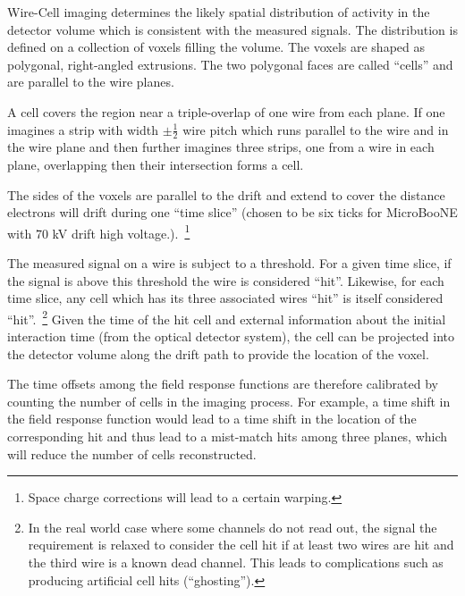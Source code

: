 Wire-Cell imaging determines the likely spatial distribution of
activity in the detector volume which is consistent with the measured
signals.  The distribution is defined on a collection of voxels
filling the volume.  The voxels are shaped as polygonal, right-angled
extrusions.  The two polygonal faces are called ``cells'' and are
parallel to the wire planes.

A cell covers the region near a triple-overlap of one wire from each
plane.  If one imagines a strip with width $\pm\frac{1}{2}$ wire pitch
which runs parallel to the wire and in the wire plane and then further
imagines three strips, one from a wire in each plane, overlapping then
their intersection forms a cell.

The sides of the voxels are parallel to the drift and extend to cover
the distance electrons will drift during one ``time slice'' (chosen to be six
ticks for MicroBooNE with 70 kV drift high voltage.).~\footnote{Space charge 
corrections will lead to a certain warping.}

The measured signal on a wire is subject to a threshold.  For a given
time slice, if the signal is above this threshold the wire is
considered ``hit''.  Likewise, for each time slice, any cell which has
its three associated wires ``hit'' is itself considered
``hit''.~\footnote{In the real world case where some channels do not
  read out, the signal the requirement is relaxed to consider the cell
  hit if at least two wires are hit and the third wire is a known dead 
channel.  This leads to complications such
  as producing artificial cell hits (``ghosting'').}  Given the time
of the hit cell and external information about the initial interaction
time (from the optical detector system), the cell can be projected
into the detector volume along the drift path to provide the location
of the voxel.

The time offsets among the field response functions are therefore calibrated by 
counting the number of cells in the imaging process. For example, a time shift in the 
field 
response function would lead to a time shift in the location of the corresponding hit 
and thus lead to a mist-match hits among three planes, which will reduce the number of 
cells reconstructed. 

